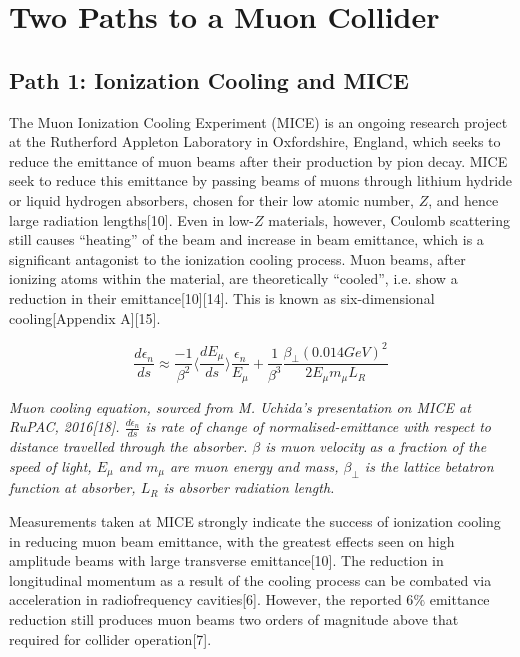 \documentclass{article}
\begin{document}
	
	\section{Two Paths to a Muon Collider}
	
	\subsection{Path 1: Ionization Cooling and MICE}
	
	
	\par The Muon Ionization Cooling Experiment (MICE) is an ongoing research project at the Rutherford Appleton Laboratory in Oxfordshire, England, which seeks to reduce the emittance of muon beams after their production by pion decay. MICE seek to reduce this emittance by passing beams of muons through lithium hydride or liquid hydrogen absorbers, chosen for their low atomic number, $Z$, and hence large radiation lengths[10]. Even in low-$Z$ materials, however, Coulomb scattering still causes “heating” of the beam and increase in beam emittance, which is a significant antagonist to the ionization cooling process. Muon beams, after ionizing atoms within the material, are theoretically “cooled”, i.e. show a reduction in their emittance[10][14]. This is known as six-dimensional cooling[Appendix A][15]. 
	
	
	$$\frac{d\epsilon_{n}}{ds} \approx \frac{-1}{\beta^2}\langle \frac{dE_\mu}{ds} \rangle \frac{\epsilon_{n}}{E_\mu} + \frac{1}{\beta^3}\frac{\beta_{\perp}(0.014GeV)^2}{2E_\mu  m_\mu L_R}$$
	
	\begin{center}
		\par \textit{Muon cooling equation, sourced from M. Uchida's presentation on MICE at RuPAC, 2016[18]. $\frac{d\epsilon_{n}}{ds}$ is rate of change of normalised-emittance with respect to distance travelled through the absorber. $\beta$ is muon velocity as a fraction of the speed of light, $E_\mu$ and $m_\mu$ are muon energy and mass, $\beta_{\perp}$ is the lattice betatron function at absorber, $L_R$ is absorber radiation length.}
	\end{center}
	
	
	
	\par Measurements taken at MICE strongly indicate the success of ionization cooling in reducing muon beam emittance, with the greatest effects seen on high amplitude beams with large transverse emittance[10]. The reduction in longitudinal momentum as a result of the cooling process can be combated via acceleration in radiofrequency cavities[6]. However, the reported 6$\%$ emittance reduction still produces muon beams two orders of magnitude above that required for collider operation[7].
	
\end{document}
